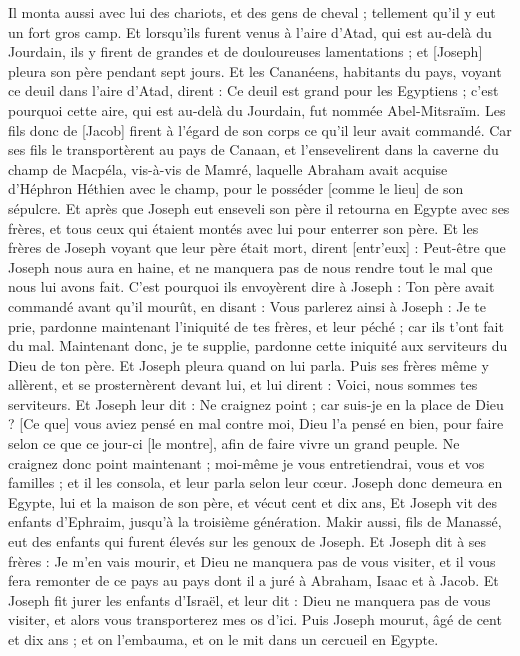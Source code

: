 \begin{multicols}{2}
Il monta aussi avec lui des chariots, et des gens de cheval ; tellement qu'il y eut un fort gros camp.
Et lorsqu'ils furent venus à l'aire d'Atad, qui est au-delà du Jourdain, ils y firent de grandes et de douloureuses lamentations ; et [Joseph] pleura son père pendant sept jours.
Et les Cananéens, habitants du pays, voyant ce deuil dans l'aire d'Atad, dirent : Ce deuil est grand pour les Egyptiens ; c'est pourquoi cette aire, qui est au-delà du Jourdain, fut nommée Abel-Mitsraïm.
Les fils donc de [Jacob] firent à l'égard de son corps ce qu'il leur avait commandé.
Car ses fils le transportèrent au pays de Canaan, et l'ensevelirent dans la caverne du champ de Macpéla, vis-à-vis de Mamré, laquelle Abraham avait acquise d'Héphron Héthien avec le champ, pour le posséder [comme le lieu] de son sépulcre.
Et après que Joseph eut enseveli son père il retourna en Egypte avec ses frères, et tous ceux qui étaient montés avec lui pour enterrer son père.
Et les frères de Joseph voyant que leur père était mort, dirent [entr'eux] : Peut-être que Joseph nous aura en haine, et ne manquera pas de nous rendre tout le mal que nous lui avons fait.
C'est pourquoi ils envoyèrent dire à Joseph : Ton père avait commandé avant qu'il mourût, en disant :
Vous parlerez ainsi à Joseph : Je te prie, pardonne maintenant l'iniquité de tes frères, et leur péché ; car ils t'ont fait du mal. Maintenant donc, je te supplie, pardonne cette iniquité aux serviteurs du Dieu de ton père. Et Joseph pleura quand on lui parla.
Puis ses frères même y allèrent, et se prosternèrent devant lui, et lui dirent : Voici, nous sommes tes serviteurs.
Et Joseph leur dit : Ne craignez point ; car suis-je en la place de Dieu ?
[Ce que] vous aviez pensé en mal contre moi, Dieu l'a pensé en bien, pour faire selon ce que ce jour-ci [le montre], afin de faire vivre un grand peuple.
Ne craignez donc point maintenant ; moi-même je vous entretiendrai, vous et vos familles ; et il les consola, et leur parla selon leur cœur.
Joseph donc demeura en Egypte, lui et la maison de son père, et vécut cent et dix ans,
Et Joseph vit des enfants d'Ephraim, jusqu'à la troisième génération. Makir aussi, fils de Manassé, eut des enfants qui furent élevés sur les genoux de Joseph.
Et Joseph dit à ses frères : Je m'en vais mourir, et Dieu ne manquera pas de vous visiter, et il vous fera remonter de ce pays au pays dont il a juré à Abraham, Isaac et à Jacob.
Et Joseph fit jurer les enfants d'Israël, et leur dit : Dieu ne manquera pas de vous visiter, et alors vous transporterez mes os d'ici.
Puis Joseph mourut, âgé de cent et dix ans ; et on l'embauma, et on le mit dans un cercueil en Egypte.
\PPE{}
\end{multicols}
